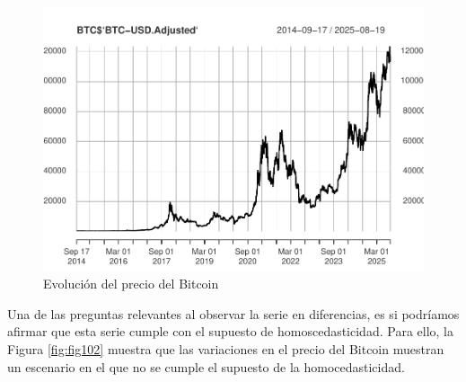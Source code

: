 \documentclass[
]{book}
\newenvironment{Shaded}{\begin{snugshade}}{\end{snugshade}}
\newcommand{\AttributeTok}[1]{\textcolor[rgb]{0.13,0.29,0.53}{#1}}
\newcommand{\DecValTok}[1]{\textcolor[rgb]{0.00,0.00,0.81}{#1}}
\newcommand{\FunctionTok}[1]{\textcolor[rgb]{0.13,0.29,0.53}{\textbf{#1}}}
\newcommand{\NormalTok}[1]{#1}
\newcommand{\OtherTok}[1]{\textcolor[rgb]{0.56,0.35,0.01}{#1}}
\newcommand{\SpecialCharTok}[1]{\textcolor[rgb]{0.81,0.36,0.00}{\textbf{#1}}}
\newcommand{\StringTok}[1]{\textcolor[rgb]{0.31,0.60,0.02}{#1}}
\begin{document}
\begin{figure}

{\centering \includegraphics{Notas-Series-Tiempo_files/figure-latex/fig101-1} 

}

\caption{Evolución del precio del Bitcoin}\label{fig:fig101}
\end{figure}

Una de las preguntas relevantes al observar la serie en diferencias, es si podríamos afirmar que esta serie cumple con el supuesto de homoscedasticidad. Para ello, la Figura \ref{fig:fig102} muestra que las variaciones en el precio del Bitcoin muestran un escenario en el que no se cumple el supuesto de la homocedasticidad.

\begin{Shaded}
\end{Shaded}
\end{document}
